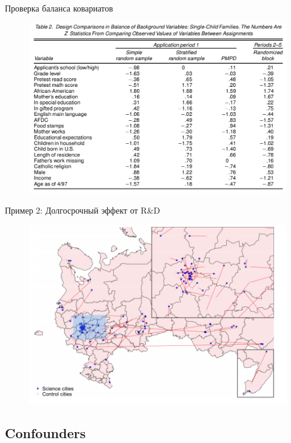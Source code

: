 \begin{frame}{Проверка баланса ковариатов}
    \begin{figure}
     \centering
     \includegraphics[width=\textwidth]{Images/Matching1.png}
\end{figure}
\end{frame}

\begin{frame}{Пример 2: Долгосрочный эффект от R&D  \parencite{schweiger2018long}}
    \begin{figure}
     \centering
     \includegraphics[width=\textwidth]{Images/Naukograds.png}
\end{figure}
\end{frame}

\subsection{Confounders}


